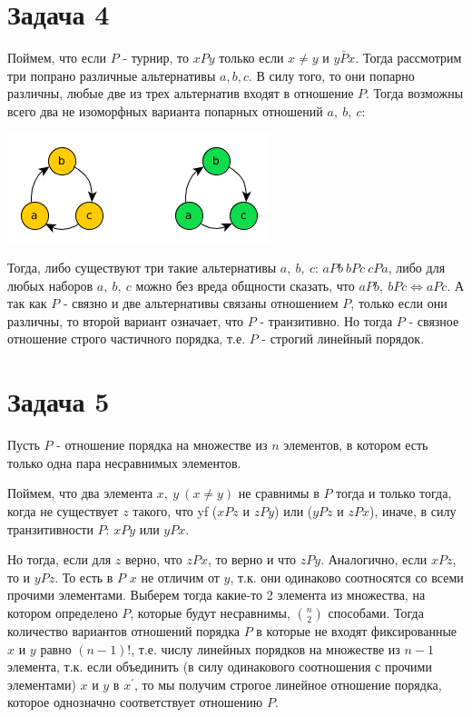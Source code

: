 \documentclass{article}
\begin{document}
	\section {Задача 4}
	Поймем, что если $P$ - турнир, то $xPy$ только если $x \ne y$ и $y\bar{P}x$. Тогда рассмотрим три попрано различные альтернативы $a, b, c$. В силу того, то они попарно различны, любые две из трех альтернатив входят в отношение $P$. Тогда возможны всего два не изоморфных варианта попарных отношений $a,\ b,\ c$:
	
	\begin{center}
		\includegraphics[scale=0.5]{4_1}
	\end{center}

	Тогда, либо существуют три такие альтернативы $a,\ b,\ c$: $aPb \ bPc \ cPa$, либо для любых наборов $a,\ b,\ c$ можно без вреда общности сказать, что $aPb,\ bPc \Leftrightarrow aPc$. А так как $P$ - связно и две альтернативы связаны отношением $P$, только если они различны, то второй вариант означает, что $P$ - транзитивно. Но тогда $P$ - связное отношение строго частичного порядка, т.е. $P$ - строгий линейный порядок.
	
	\section{Задача 5}
	Пусть $P$ - отношение порядка на множестве из $n$ 
	элементов, в котором есть только одна пара несравнимых элементов.
	
	Поймем, что два элемента $x,\ y\ (x \ne y)$ не сравнимы в $P$ тогда и только тогда, когда не существует $z$ такого, что yf   ($xPz$ и $zPy$) или ($yPz$ и $zPx$), иначе, в силу транзитивности $P$: $xPy$ или $yPx$.
	
	Но тогда, если для $z$ верно, что $zPx$, то верно и что $zPy$. Аналогично, если $xPz$, то и $yPz$. То есть в $P$ $x$ не отличим от $y$, т.к. они одинаково соотносятся со всеми прочими элементами. Выберем тогда какие-то 2 элемента из множества, на котором определено $P$, которые будут несравнимы, ${n \choose 2}$ способами. Тогда количество вариантов отношений порядка $P$ в которые не входят фиксированные $x$ и $y$ равно $(n - 1)!$, т.е. числу линейных порядков на множестве из $n - 1$ элемента, т.к. если объединить (в силу одинакового соотношения с прочими элементами) $x$ и $y$ в $x^{\prime}$, то мы получим строгое линейное отношение порядка, которое однозначно соответствует отношению $P$.
	
\end{document}
